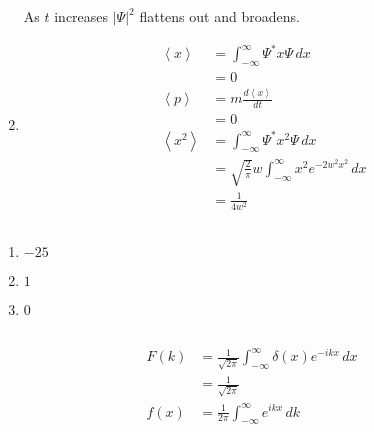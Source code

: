 \documentclass{article}
\newcommand{\ev}[1]{\left< #1 \right>}
\begin{document}
\begin{enumerate}
        As $t$ increases $|\Psi|^2$ flattens out and broadens.

  \item

        \begin{align*}
          \ev{x}   & = \int_{-\infty}^\infty \Psi^* x \Psi \,d x                             \\
                   & = 0                                                                     \\
          \ev{p}   & = m \frac{d \ev{x}}{d t}                                                \\
                   & = 0                                                                     \\
          \ev{x^2} & = \int_{-\infty}^\infty \Psi^* x^2 \Psi \,d x                           \\
                   & = \sqrt{\frac{2}{\pi}} w \int_{-\infty}^\infty x^2 e^{-2 w^2 x^2} \,d x \\
                   & = \frac{1}{4 w^2}
        \end{align*}
\end{enumerate}

\subsection{}

\begin{enumerate}
  \item $-25$

  \item $1$

  \item $0$
\end{enumerate}

\setcounter{subsection}{25}
\subsection{}

\begin{align*}
  F(k) & = \frac{1}{\sqrt{2 \pi}} \int_{-\infty}^\infty \delta(x) e^{-i k x} \,d x \\
       & = \frac{1}{\sqrt{2 \pi}}                                                  \\
  f(x) & = \frac{1}{2 \pi} \int_{-\infty}^\infty e^{i k x} \,d k
\end{align*}

\setcounter{subsection}{28}
\end{document}
